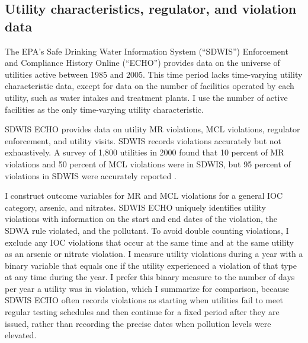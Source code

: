 \documentclass[12pt]{article}
\begin{document}

\subsection{Utility characteristics, regulator, and violation data}

The EPA's Safe Drinking Water Information System (``SDWIS'') Enforcement and Compliance History Online (``ECHO'') provides data on the universe of utilities active between 1985 and 2005. This time period lacks time-varying utility characteristic data, except for data on the number of facilities operated by each utility, such as water intakes and treatment plants. I use the number of active facilities as the only time-varying utility characteristic.

SDWIS ECHO provides data on utility MR violations, MCL violations, regulator enforcement, and utility visits. SDWIS records violations accurately but not exhaustively. A survey of 1,800 utilities in 2000 found that 10 percent of MR violations and 50 percent of MCL violations were in SDWIS, but 95 percent of violations in SDWIS were accurately reported \parencite{epaviolationreliability}.

I construct outcome variables for MR and MCL violations for a general IOC category, arsenic, and nitrates. SDWIS ECHO uniquely identifies utility violations with information on the start and end dates of the violation, the SDWA rule violated, and the pollutant. To avoid double counting violations, I exclude any IOC violations that occur at the same time and at the same utility as an arsenic or nitrate violation. I measure utility violations during a year with a binary variable that equals one if the utility experienced a violation of that type at any time during the year. I prefer this binary measure to the number of days per year a utility was in violation, which I summarize for comparison, because SDWIS ECHO often records violations as starting when utilities fail to meet regular testing schedules and then continue for a fixed period after they are issued, rather than recording the precise dates when pollution levels were elevated. 

\end{document}
